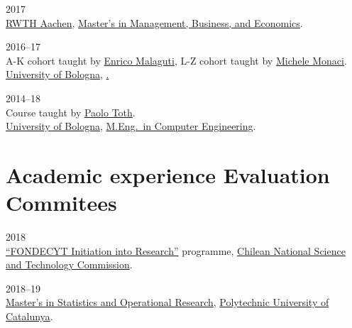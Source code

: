 \begin{paracol}{2}
  \textsc{2017}
\switchcolumn
  \\
  \href{http://www.rwth-aachen.de/}{RWTH Aachen}, \href{http://www.wiwi.rwth-aachen.de/cms/Wirtschaftswissenschaften/Studium/Studiengaenge/Masterstudiengaenge/~camq/Wirtschaftswissenschaft-M-Sc-/?lidx=1}{Master's in Management, Business, and Economics}.
\end{paracol}

\begin{paracol}{2}
  \textsc{2016--17}
\switchcolumn
  \\
  A-K cohort taught by \href{https://scholar.google.com/citations?user=3nD4vYkAAAAJ}{Enrico Malaguti}, L-Z cohort taught by \href{https://scholar.google.com/citations?user=wORMYBMAAAAJ}{Michele Monaci}.\\
  \href{https://www.unibo.it}{University of Bologna}, \href{B.Eng.\ in Management Engineering}.
\end{paracol}

\begin{paracol}{2}
  \textsc{2014--18}
\switchcolumn
  \\
  Course taught by \href{https://scholar.google.com/citations?user=2IPL4XIAAAAJ}{Paolo Toth}.\\
  \href{https://www.unibo.it}{University of Bologna}, \href{https://corsi.unibo.it/magistrale/ingegneriainformatica}{M.Eng.\ in Computer Engineering}.
\end{paracol}

\section*{Academic experience {\small Evaluation Commitees}}

\begin{paracol}{2}
  \textsc{2018}
\switchcolumn
  \\
  \href{http://www.conicyt.cl/fondecyt/fondecyt-program/}{``FONDECYT Initiation into Research''} programme, \href{http://www.conicyt.cl/}{Chilean National Science and Technology Commission}.
\end{paracol}

\begin{paracol}{2}
  \textsc{2018--19}
\switchcolumn
  \\
  \href{https://mesioupcub.masters.upc.edu/en}{Master's in Statistics and Operational Research}, \href{https://www.upc.edu/en}{Polytechnic University of Catalunya}.
\end{paracol}

